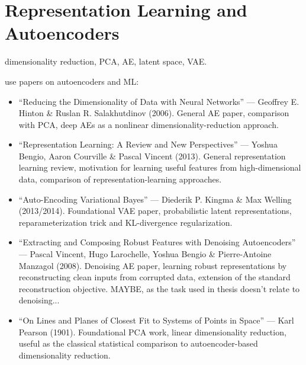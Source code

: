\section{Representation Learning and Autoencoders}
dimensionality reduction, PCA, AE, latent space, VAE.

use papers on autoencoders and ML:
\begin{itemize}
    \item “Reducing the Dimensionality of Data with Neural Networks” — Geoffrey E. Hinton \& Ruslan R. Salakhutdinov (2006). General AE paper, comparison with PCA, deep AEs as a nonlinear dimensionality-reduction approach.
    \item “Representation Learning: A Review and New Perspectives” — Yoshua Bengio, Aaron Courville \& Pascal Vincent (2013). General representation learning review, motivation for learning useful features from high-dimensional data, comparison of representation-learning approaches.
    \item “Auto-Encoding Variational Bayes” — Diederik P. Kingma \& Max Welling (2013/2014). Foundational VAE paper, probabilistic latent representations, reparameterization trick and KL-divergence regularization.
    \item “Extracting and Composing Robust Features with Denoising Autoencoders” — Pascal Vincent, Hugo Larochelle, Yoshua Bengio \& Pierre-Antoine Manzagol (2008). Denoising AE paper, learning robust representations by reconstructing clean inputs from corrupted data, extension of the standard reconstruction objective. MAYBE, as the task used in thesis doesn't relate to denoising...
    \item “On Lines and Planes of Closest Fit to Systems of Points in Space” — Karl Pearson (1901). Foundational PCA work, linear dimensionality reduction, useful as the classical statistical comparison to autoencoder-based dimensionality reduction.
\end{itemize}
